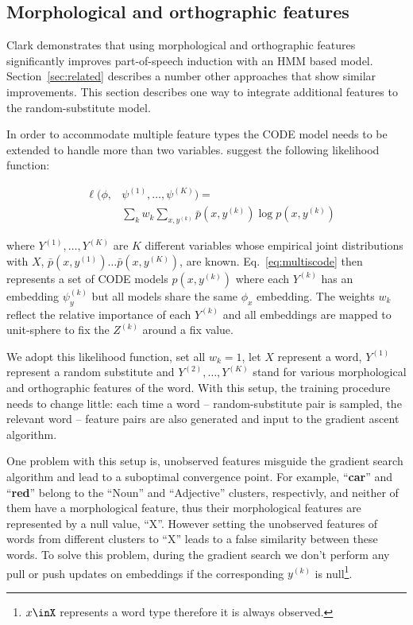 \subsection{Morphological and orthographic features}\label{sec:feat}

Clark  demonstrates that
using morphological and orthographic features significantly improves
part-of-speech induction with an HMM based model.
Section~\ref{sec:related} describes a number other approaches that
show similar improvements.  This section describes one way to
integrate additional features to the random-substitute model.

In order to accommodate multiple feature types the CODE model needs to
be extended to handle more than two variables.
\cite{globerson2007euclidean} suggest the following likelihood
function:

\begin{eqnarray}
&\ell(\phi,& \psi^{(1)}, \ldots, \psi^{(K)}) = \label{eq:multiscode}\\
&&\sum_k w_k \sum_{x,y^{(k)}} \bar{p}(x,y^{(k)}) \log p(x,y^{(k)}) \nonumber
\end{eqnarray}

\noindent where $Y^{(1)}, \ldots, Y^{(K)}$ are $K$ different variables
whose empirical joint distributions with $X$,
$\bar{p}(x,y^{(1)})\ldots\bar{p}(x,y^{(K)})$, are known.
Eq.~\ref{eq:multiscode} then represents a set of CODE models
$p(x,y^{(k)})$ where each $Y^{(k)}$ has an embedding $\psi_y^{(k)}$
but all models share the same $\phi_x$ embedding.  The weights $w_k$
reflect the relative importance of each $Y^{(k)}$ and all embeddings
are mapped to unit-sphere to fix the $Z^{(k)}$ around a fix value.

We adopt this likelihood function, set all $w_k=1$, let $X$
represent a word, $Y^{(1)}$ represent a random substitute and
$Y^{(2)}, \ldots, Y^{(K)}$ stand for various morphological and
orthographic features of the word.  With this setup, the training
procedure needs to change little: each time a word --
random-substitute pair is sampled, the relevant word -- feature pairs
are also generated and input to the gradient ascent algorithm.

One problem with this setup is, unobserved features misguide the
gradient search algorithm and lead to a suboptimal convergence point.
For example, ``\textbf{car}'' and ``\textbf{red}'' belong to the ``Noun''
and ``Adjective'' clusters, respectivly, and neither of them have a
morphological feature, thus their morphological features are
represented by a null value, ``X''.  However setting the unobserved
features of words from different clusters to ``X'' leads to a false
similarity between these words.  To solve this problem, during the
gradient search we don't perform any pull or push updates on
embeddings if the corresponding $y^{(k)}$ is null\footnote{$x\inX$
  represents a word type therefore it is always observed.}.

